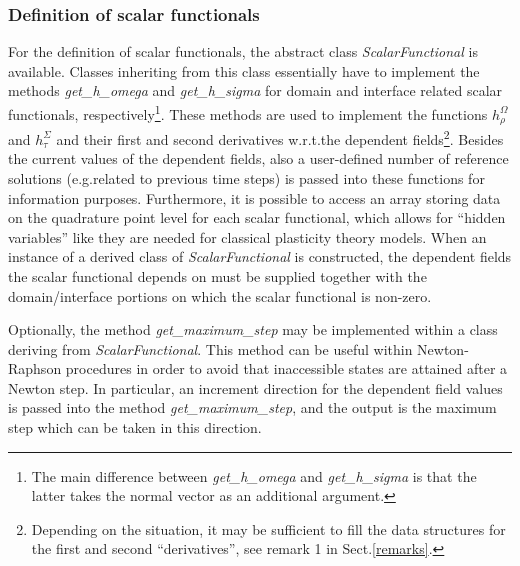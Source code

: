 \documentclass[pdftex,a4paper,12pt,abstracton]{scrartcl}
\begin{document}
\subsubsection{Definition of scalar functionals}
For the definition of scalar functionals, the abstract class \textit{ScalarFunctional} is available. Classes inheriting from this class essentially have to implement the methods \textit{get\_h\_omega} and \textit{get\_h\_sigma} for domain and interface related scalar functionals, respectively\footnote{The main difference between \textit{get\_h\_omega} and \textit{get\_h\_sigma} is that the latter takes the normal vector as an additional argument.}. These methods are used to implement the functions $h^\Omega_\rho$ and $h^\Sigma_\tau$ and their first and second derivatives w.r.t.\@ the dependent fields\footnote{Depending on the situation, it may be sufficient to fill the data structures for the first and second ``derivatives'', see remark 1 in Sect.\@ \ref{remarks}.}. Besides the current values of the dependent fields, also a user-defined number of reference solutions (e.g.\@ related to previous time steps) is passed into these functions for information purposes. Furthermore, it is possible to access an array storing data on the quadrature point level for each scalar functional, which allows for ``hidden variables'' like they are needed for classical plasticity theory models. When an instance of a derived class of \textit{ScalarFunctional} is constructed, the dependent fields the scalar functional depends on must be supplied together with the domain/interface portions on which the scalar functional is non-zero.

Optionally, the method \textit{get\_maximum\_step} may be implemented within a class deriving from \textit{ScalarFunctional}. This method can be useful within Newton-Raphson procedures in order to avoid that inaccessible states are attained after a Newton step. In particular, an increment direction for the dependent field values is passed into the method \textit{get\_maximum\_step}, and the output is the maximum step which can be taken in this direction.
\end{document}
